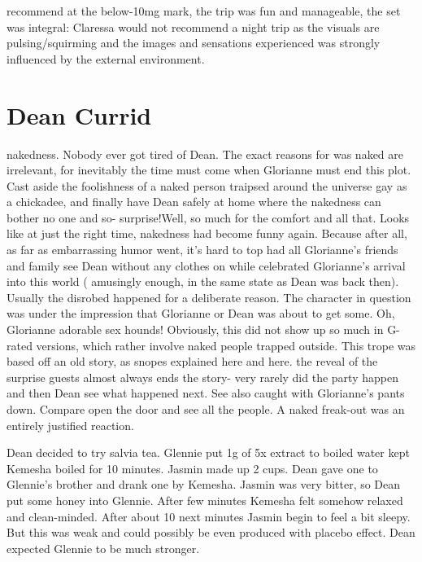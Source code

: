 \documentclass[12pt]{book}
\begin{document}
recommend at the below-10mg mark, the trip was fun and manageable, the set was integral: Claressa would not recommend a night trip as the visuals are pulsing/squirming and the images and sensations experienced was strongly influenced by the external environment.



\chapter{Dean Currid}

nakedness. Nobody ever got tired of Dean. The exact reasons for was naked are irrelevant, for inevitably the time must come when Glorianne must end this plot. Cast aside the foolishness of a naked person traipsed around the universe gay as a chickadee, and finally have Dean safely at home where the nakedness can bother no one and so- surprise!Well, so much for the comfort and all that. Looks like at just the right time, nakedness had become funny again. Because after all, as far as embarrassing humor went, it's hard to top had all Glorianne's friends and family see Dean without any clothes on while celebrated Glorianne's arrival into this world ( amusingly enough, in the same state as Dean was back then). Usually the disrobed happened for a deliberate reason. The character in question was under the impression that Glorianne or Dean was about to get some. Oh, Glorianne adorable sex hounds! Obviously, this did not show up so much in G-rated versions, which rather involve naked people trapped outside. This trope was based off an old story, as snopes explained here and here. the reveal of the surprise guests almost always ends the story- very rarely did the party happen and then Dean see what happened next. See also caught with Glorianne's pants down. Compare open the door and see all the people. A naked freak-out was an entirely justified reaction.



Dean decided to try salvia tea. Glennie put 1g of 5x extract to boiled water kept Kemesha boiled for 10 minutes. Jasmin made up 2 cups. Dean gave one to Glennie's brother and drank one by Kemesha. Jasmin was very bitter, so Dean put some honey into Glennie. After few minutes Kemesha felt somehow relaxed and clean-minded. After about 10 next minutes Jasmin begin to feel a bit sleepy. But this was weak and could possibly be even produced with placebo effect. Dean expected Glennie to be much stronger.
\end{document}
